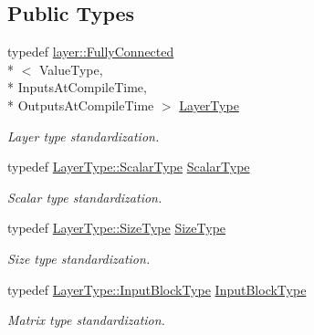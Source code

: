 \subsection*{Public Types}
\begin{DoxyCompactItemize}
\item 
typedef \hyperlink{classffnn_1_1layer_1_1_fully_connected}{layer\-::\-Fully\-Connected}\\*
$<$ Value\-Type, \\*
Inputs\-At\-Compile\-Time, \\*
Outputs\-At\-Compile\-Time $>$ \hyperlink{classffnn_1_1optimizer_1_1_gradient_descent_3_01layer_1_1_fully_connected_3_01_value_type_00_01_5f7b01db2ae4d39760d70ee323649a60_ad0c1e85b8917062542e3fdfceb41101d}{Layer\-Type}
\begin{DoxyCompactList}\small\item\em Layer type standardization. \end{DoxyCompactList}\item 
typedef \hyperlink{classffnn_1_1layer_1_1_fully_connected_ac3ff6f72846f84f89c0d6e10f138c7e3}{Layer\-Type\-::\-Scalar\-Type} \hyperlink{classffnn_1_1optimizer_1_1_gradient_descent_3_01layer_1_1_fully_connected_3_01_value_type_00_01_5f7b01db2ae4d39760d70ee323649a60_a42ef0b08c6843fa4e706c3e3110d0c95}{Scalar\-Type}
\begin{DoxyCompactList}\small\item\em Scalar type standardization. \end{DoxyCompactList}\item 
typedef \hyperlink{classffnn_1_1layer_1_1_fully_connected_ae1b5e64828482a4c3eea0e2b0ba3f826}{Layer\-Type\-::\-Size\-Type} \hyperlink{classffnn_1_1optimizer_1_1_gradient_descent_3_01layer_1_1_fully_connected_3_01_value_type_00_01_5f7b01db2ae4d39760d70ee323649a60_aefaefc86292acdb7d508c467102f7b19}{Size\-Type}
\begin{DoxyCompactList}\small\item\em Size type standardization. \end{DoxyCompactList}\item 
typedef \hyperlink{classffnn_1_1layer_1_1_fully_connected_a8fb8f9b598085d3a05214f38f70adfc7}{Layer\-Type\-::\-Input\-Block\-Type} \hyperlink{classffnn_1_1optimizer_1_1_gradient_descent_3_01layer_1_1_fully_connected_3_01_value_type_00_01_5f7b01db2ae4d39760d70ee323649a60_adf63a5c9be6baf42f54450549b809b73}{Input\-Block\-Type}
\begin{DoxyCompactList}\small\item\em Matrix type standardization. \end{DoxyCompactList}\item 

\end{DoxyCompactItemize}
